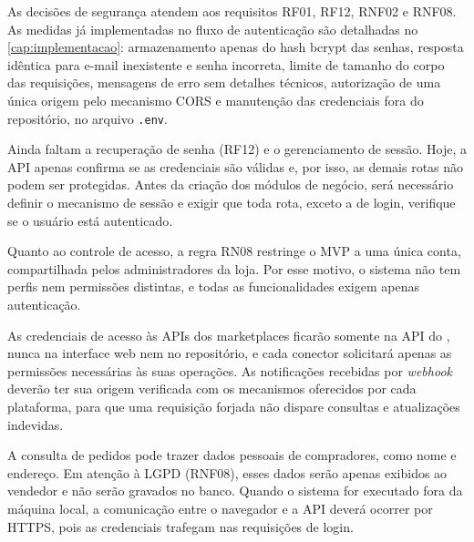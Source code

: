 As decisões de segurança atendem aos requisitos RF01, RF12, RNF02 e RNF08. As medidas já implementadas no fluxo de autenticação são detalhadas no \autoref{cap:implementacao}: armazenamento apenas do hash bcrypt das senhas, resposta idêntica para e-mail inexistente e senha incorreta, limite de tamanho do corpo das requisições, mensagens de erro sem detalhes técnicos, autorização de uma única origem pelo mecanismo CORS e manutenção das credenciais fora do repositório, no arquivo \texttt{.env}.

Ainda faltam a recuperação de senha (RF12) e o gerenciamento de sessão. Hoje, a API apenas confirma se as credenciais são válidas e, por isso, as demais rotas não podem ser protegidas. Antes da criação dos módulos de negócio, será necessário definir o mecanismo de sessão e exigir que toda rota, exceto a de login, verifique se o usuário está autenticado.

Quanto ao controle de acesso, a regra RN08 restringe o MVP a uma única conta, compartilhada pelos administradores da loja. Por esse motivo, o sistema não tem perfis nem permissões distintas, e todas as funcionalidades exigem apenas autenticação.

As credenciais de acesso às APIs dos marketplaces ficarão somente na API do \sistema{}, nunca na interface web nem no repositório, e cada conector solicitará apenas as permissões necessárias às suas operações. As notificações recebidas por \textit{webhook} deverão ter sua origem verificada com os mecanismos oferecidos por cada plataforma, para que uma requisição forjada não dispare consultas e atualizações indevidas.

A consulta de pedidos pode trazer dados pessoais de compradores, como nome e endereço. Em atenção à LGPD (RNF08), esses dados serão apenas exibidos ao vendedor e não serão gravados no banco. Quando o sistema for executado fora da máquina local, a comunicação entre o navegador e a API deverá ocorrer por HTTPS, pois as credenciais trafegam nas requisições de login.
